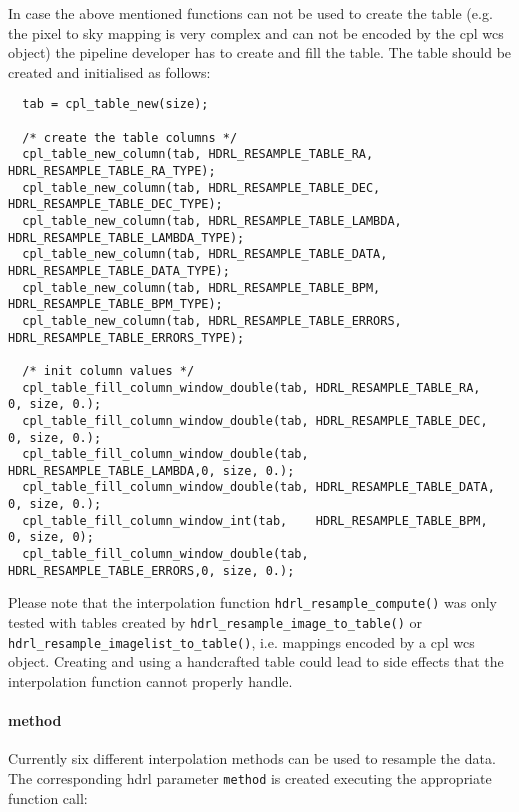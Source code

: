 In case the above mentioned functions can not be used to create the table
(e.g. the pixel to sky mapping is very complex and can not be encoded by the cpl
wcs object) the pipeline developer has to create and fill the table. The table should be
created and initialised as follows:

{
\footnotesize
\begin{lstlisting}
  tab = cpl_table_new(size);
  
  /* create the table columns */
  cpl_table_new_column(tab, HDRL_RESAMPLE_TABLE_RA,     HDRL_RESAMPLE_TABLE_RA_TYPE);
  cpl_table_new_column(tab, HDRL_RESAMPLE_TABLE_DEC,    HDRL_RESAMPLE_TABLE_DEC_TYPE);
  cpl_table_new_column(tab, HDRL_RESAMPLE_TABLE_LAMBDA, HDRL_RESAMPLE_TABLE_LAMBDA_TYPE);
  cpl_table_new_column(tab, HDRL_RESAMPLE_TABLE_DATA,   HDRL_RESAMPLE_TABLE_DATA_TYPE);
  cpl_table_new_column(tab, HDRL_RESAMPLE_TABLE_BPM,    HDRL_RESAMPLE_TABLE_BPM_TYPE);
  cpl_table_new_column(tab, HDRL_RESAMPLE_TABLE_ERRORS, HDRL_RESAMPLE_TABLE_ERRORS_TYPE);

  /* init column values */
  cpl_table_fill_column_window_double(tab, HDRL_RESAMPLE_TABLE_RA,    0, size, 0.);
  cpl_table_fill_column_window_double(tab, HDRL_RESAMPLE_TABLE_DEC,   0, size, 0.);
  cpl_table_fill_column_window_double(tab, HDRL_RESAMPLE_TABLE_LAMBDA,0, size, 0.);
  cpl_table_fill_column_window_double(tab, HDRL_RESAMPLE_TABLE_DATA,  0, size, 0.);
  cpl_table_fill_column_window_int(tab,    HDRL_RESAMPLE_TABLE_BPM,   0, size, 0);
  cpl_table_fill_column_window_double(tab, HDRL_RESAMPLE_TABLE_ERRORS,0, size, 0.);
\end{lstlisting}
}

Please note that the interpolation function \verb+hdrl_resample_compute()+ was
only tested with tables created by \verb+hdrl_resample_image_to_table()+ or
\verb+hdrl_resample_imagelist_to_table()+, i.e. mappings encoded by a cpl wcs
object. Creating and using a handcrafted table could lead to side effects that the
interpolation function cannot properly handle.


\paragraph*{method}
Currently six different interpolation methods can be used to resample the data. The corresponding hdrl parameter \verb+method+ is created executing the
appropriate function call:

